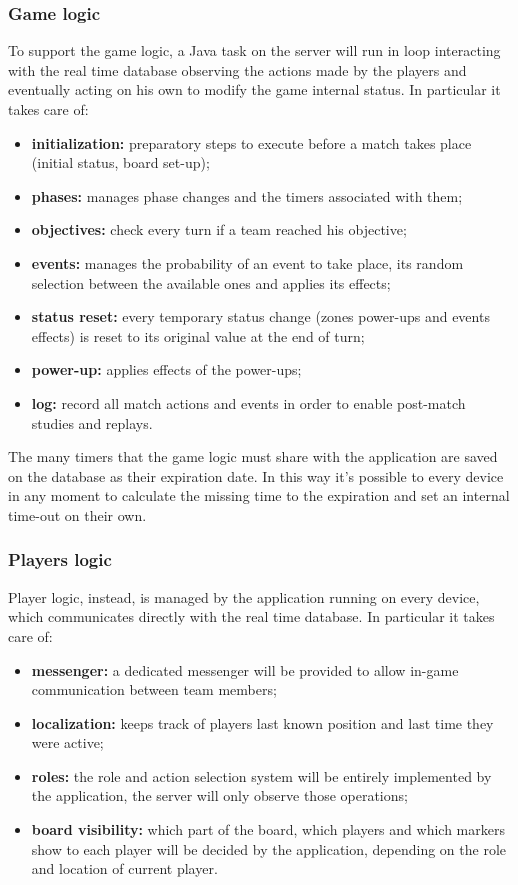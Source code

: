 			\subsubsection{Game logic}
			
				To support the game logic, a Java task on the server will run in loop interacting with the real time database observing the actions made by the players and eventually acting on his own to modify the game internal status. In particular it takes care of:
				\begin{itemize}
					\item \textbf{initialization:} preparatory steps to execute before a match takes place (initial status, board set-up);
					\item \textbf{phases:} manages phase changes and the timers associated with them;
					\item \textbf{objectives:} check every turn if a team reached his objective;
					\item \textbf{events:} manages the probability of an event to take place, its random selection between the available ones and applies its effects;
					\item \textbf{status reset:} every temporary status change (zones power-ups and events effects) is reset to its original value at the end of turn;
					\item \textbf{power-up:} applies effects of the power-ups;
					\item \textbf{log:} record all match actions and events in order to enable post-match studies and replays.  
				\end{itemize}
				
				The many timers that the game logic must share with the application are saved on the database as their expiration date. In this way it's possible to every device in any moment to calculate the missing time to the expiration and set an internal time-out on their own.
			
			\subsubsection{Players logic}
			
				Player logic, instead, is managed by the application running on every device, which communicates directly with the real time database. In particular it takes care of:
				\begin{itemize}
					\item \textbf{messenger:} a dedicated messenger will be provided to allow in-game communication between team members;
					\item \textbf{localization:} keeps track of players last known position and last time they were active;
					\item \textbf{roles:} the role and action selection system will be entirely implemented by the application, the server will only observe those operations;
					\item \textbf{board visibility:} which part of the board, which players and which markers show to each player will be decided by the application, depending on the role and location of current player.
				\end{itemize}
			

